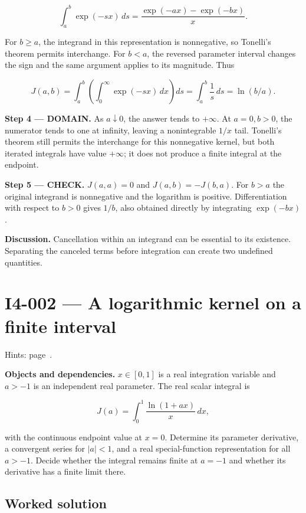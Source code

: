 \documentclass[11pt,oneside,openany]{book}
\begin{document}
\[
\int_a^b\exp(-sx)\,ds=\frac{\exp(-ax)-\exp(-bx)}{x}.
\]

For \(b\ge a\), the integrand in this representation is nonnegative, so Tonelli's theorem permits interchange. For \(b<a\), the reversed parameter interval changes the sign and the same argument applies to its magnitude. Thus

\[
J(a,b)=\int_a^b\left(\int_0^\infty\exp(-sx)\,dx\right)ds
=\int_a^b\frac1s\,ds=\ln(b/a).
\]

\begin{DomainStep}
\textbf{Step 4 --- DOMAIN.} As \(a\downarrow0\), the answer tends to \(+\infty\). At \(a=0,b>0\), the numerator tends to one at infinity, leaving a nonintegrable \(1/x\) tail. Tonelli's theorem still permits the interchange for this nonnegative kernel, but both iterated integrals have value \(+\infty\); it does not produce a finite integral at the endpoint.

\end{DomainStep}
\textbf{Step 5 --- CHECK.} \(J(a,a)=0\) and \(J(a,b)=-J(b,a)\). For \(b>a\) the original integrand is nonnegative and the logarithm is positive. Differentiation with respect to \(b>0\) gives \(1/b\), also obtained directly by integrating \(\exp(-bx)\).

\textbf{Discussion.} Cancellation within an integrand can be essential to its existence. Separating the canceled terms before integration can create two undefined quantities.
\clearpage
\section{I4-002 --- A logarithmic kernel on a finite interval}
\label{problem:I4-002}
{\small Hints: page~\pageref{hints:I4-002}.}\par\medskip

\textbf{Objects and dependencies.} \(x\in[0,1]\) is a real integration variable and \(a>-1\) is an independent real parameter. The real scalar integral is

\[
J(a)=\int_0^1\frac{\ln(1+ax)}{x}\,dx,
\]

with the continuous endpoint value at \(x=0\). Determine its parameter derivative, a convergent series for \(|a|<1\), and a real special-function representation for all \(a>-1\). Decide whether the integral remains finite at \(a=-1\) and whether its derivative has a finite limit there.
\subsection*{Worked solution}
\end{document}
